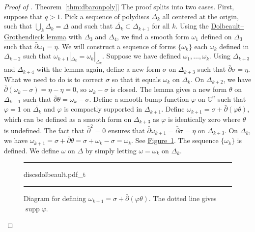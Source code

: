 \documentclass[12pt,openany]{book}
\newcommand{\supp}{\operatorname{supp}}
\newcommand{\C}{{\mathbb{C}}}
\theoremstyle{plain}
\theoremstyle{remark}
\theoremstyle{definition}
\newenvironment{myfig}{%
\begin{figure}[h!t]
\noindent\rule{\textwidth}{0.5pt}\vspace{12pt}\par\centering}%
{\par\noindent\rule{\textwidth}{0.5pt}
\end{figure}}
\theoremstyle{exercise}
\theoremstyle{example}
\newcommand{\figureref}[1]{\hyperref[#1]{Figure~\ref*{#1}}}
\newcommand{\thmref}[1]{\hyperref[#1]{Theorem~\ref*{#1}}}
\begin{document}
\begin{proof}[Proof of \thmref{thm:dbaronpoly}]
The proof splits into two cases.  First, suppose that $q > 1$.
Pick a sequence of polydiscs $\Delta_k$ all centered at the origin,
such that $\bigcup_k \Delta_k = \Delta$ and such that $\overline{\Delta_k}
\subset \Delta_{k+1}$ for all $k$.
Using the
\hyperref[lemma:dolgro]{Dolbeault--Grothendieck lemma} with $\Delta_3$ and
$\Delta_4$, we find a smooth form $\omega_1$ defined on
$\Delta_3$ such that $\bar{\partial} \omega_1 = \eta$.
We will construct a sequence of forms $\{ \omega_k \}$
each $\omega_k$ defined in $\Delta_{k+2}$
such that $\omega_{k+1}|_{\Delta_k} = \omega_k|_{\Delta_k}$.
Suppose we have defined $\omega_1,\ldots,\omega_k$.
Using $\Delta_{k+3}$ and $\Delta_{k+4}$ with the lemma again,
define a new form $\sigma$ on $\Delta_{k+3}$ such that $\bar{\partial}
\sigma = \eta$.  What we need to do is to correct $\sigma$ so that it equals
$\omega_k$ on $\Delta_k$.  On $\Delta_{k+2}$, we have
$\bar{\partial}(\omega_k-\sigma) = \eta-\eta = 0$, so $\omega_k-\sigma$
is closed.  The lemma gives a new form $\theta$ on $\Delta_{k+1}$ such that
$\bar{\partial}\theta = \omega_k-\sigma$.
Define a smooth bump function $\varphi$ on $\C^n$ such that $\varphi=1$ on
$\overline{\Delta_{k}}$ and $\varphi$ is compactly supported in
$\Delta_{k+1}$.  Define
$\omega_{k+1} = \sigma + \bar{\partial}(\varphi \theta)$, which can be
defined as a smooth form on $\Delta_{k+3}$ as $\varphi$ is identically zero
where $\theta$ is undefined.  The fact that
$\bar{\partial}^2=0$ ensures that $\bar{\partial}\omega_{k+1} =
\bar{\partial} \sigma = \eta$ on $\Delta_{k+3}$.  On $\Delta_k$, we have
$\omega_{k+1} = \sigma + \bar{\partial}\theta = \sigma+\omega_k-\sigma=\omega_k$.
See \figureref{fig:discsdolbeault}.
The sequence $\{ \omega_k \}$ is defined.
We define $\omega$ on $\Delta$ by simply letting $\omega =
\omega_k$ on $\Delta_k$.

\begin{myfig}
{discsdolbeault.pdf_t}
\caption{Diagram for defining $\omega_{k+1}=\sigma + \bar{\partial}(\varphi \theta)$.
The dotted line gives $\supp \varphi$.\label{fig:discsdolbeault}}
\end{myfig}


\end{proof}
\end{document}
